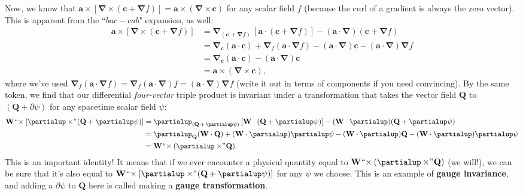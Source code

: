 \documentclass[12pt]{article}
\renewcommand{\vv}[1]{\mathbf{#1}}
\newcommand{\del}{\boldsymbol{\nabla}}
\begin{document}
Now, we know that $\vv a \times [ \del \times (\vv c + \del f) ] = \vv a \times (\del \times \vv c)$ for any scalar field $f$ (because the curl of a gradient is always the zero vector). This is apparent from the ``$bac - cab$" expansion, as well:
\begin{equation*}
\begin{split}
\vv a \times [ \del \times (\vv c + \del f) ] &= \del_{( \vv c \, + \del f )} \, [ \vv a \cdot ( \vv c + \del f ) ] - (\vv a \cdot \del) ( \vv c + \del f ) \\
&= \del_{\vv c} ( \vv a \cdot \vv c ) + \del_{f} ( \vv a \cdot \del f ) - (\vv a \cdot \del) \vv c - (\vv a \cdot \del) \del f \\
&= \del_{\vv c} ( \vv a \cdot \vv c ) - (\vv a \cdot \del) \vv c \\
&= \vv a \times (\del \times \vv c) ,
\end{split}
\end{equation*}
where we've used $\del_{f} ( \vv a \cdot \del f ) = \del_{f} ( \vv a \cdot \del ) f = ( \vv a \cdot \del ) \del f$ (write it out in terms of components if you need convincing). By the same token, we find that our differential \emph{four-vector} triple product is invariant under a transformation that takes the vector field $\vv Q$ to $(\vv Q + \partialup \psi)$ for any spacetime scalar field $\psi$:
\begin{equation*}
\begin{split}
\vv W \mkern1mu `` \mkern-4mu \times [ \partialup \times \mkern-4mu " \mkern1mu ( \vv Q + \partialup \psi ) ] &= \partialup_{( \vv Q  \, + \, \partialup \psi )} \, [ \vv W \cdot ( \vv Q + \partialup \psi ) ] - (\vv W \cdot \partialup) ( \vv Q + \partialup \psi ) \\
&= \partialup_{\vv Q} ( \vv W \cdot \vv Q ) + ( \vv W \cdot \partialup) \partialup \psi - (\vv W \cdot \partialup) \vv Q - (\vv W \cdot \partialup) \partialup \psi \\
&= \vv W \mkern1mu `` \mkern-4mu \times (\partialup \times \mkern-4mu " \mkern1mu \vv Q) .
\end{split}
\end{equation*}
This is an important identity! It means that if we ever encounter a physical quantity equal to $\vv W \mkern1mu `` \mkern-4mu \times (\partialup \times \mkern-4mu " \mkern1mu \vv Q)$ (we will!), we can be sure that it's also equal to $\vv W \mkern1mu `` \mkern-4mu \times [ \partialup \times \mkern-4mu " \mkern1mu ( \vv Q + \partialup \psi ) ]$ for any $\psi$ we choose. This is an example of \textbf{gauge invariance}, and adding a $\partialup \psi$ to $\vv Q$ here is called making a \textbf{gauge transformation}.
\end{document}
